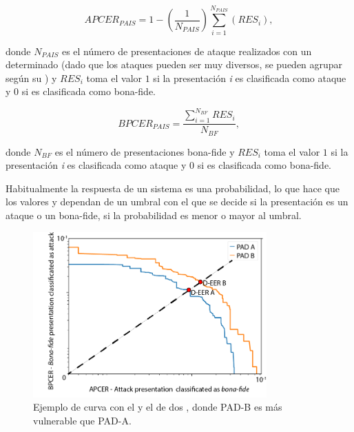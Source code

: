 \begin{equation}
APCER_{PAIS} = 1 - \left( \frac{1}{N_{PAIS}} \right)\sum_{i=1}^{N_{PAIS}} \left( RES_{i} \right),
\label{eqn:APCER}
\end{equation}

donde $N_{PAIS}$ es el número de presentaciones de ataque realizados con un determinado  (dado que los ataques pueden ser muy diversos, se pueden agrupar según su ) y $RES_{i}$ toma el valor $1$ si la presentación \textit{i} es clasificada como ataque y $0$ si es clasificada como \gls{bona-fide}.  

\begin{equation}
BPCER_{PAIS}=\frac{\sum_{i=1}^{N_{BF}} RES_{i}} {N_{BF}},
\label{eqn:BPCER}
\end{equation}

donde $N_{BF}$ es el número de presentaciones \gls{bona-fide} y $RES_{i}$ toma el valor $1$ si la presentación \textit{i} es clasificada como ataque y $0$ si es clasificada como \gls{bona-fide}.  

Habitualmente la respuesta de un sistema  es una probabilidad, lo que hace que los valores  y  dependan de un umbral con el que se decide si la presentación es un ataque o un \gls{bona-fide}, si la probabilidad es menor o mayor al umbral. 


\begin{figure}
    \centering
    \includegraphics[width=0.8\textwidth]{ch-sistemasABC/images/ch-SistemasABC/EJEMPLO_CURVA_DET_APCER_BPCER.png}
    \caption{Ejemplo de curva  con el  y el  de dos , donde PAD-B es más vulnerable que PAD-A.}
    \label{fig:ejemploCurvaAPCER-BPCER}
\end{figure}


